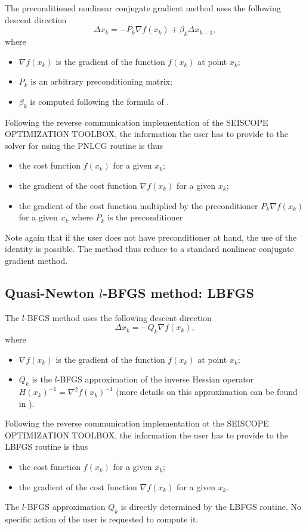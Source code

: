 \documentclass[a4paper,twoside,final,onecolumn,11pt,openright]{article}
\begin{document}
The preconditioned nonlinear conjugate gradient method uses the following descent direction
\begin{equation}
\label{nlcg}
 \Delta x_k=-P_k\nabla f(x_k)+ \beta_k \Delta x_{k-1},
\end{equation}
where 
\begin{itemize}
 \item $\nabla f(x_k)$ is the gradient of the function $f(x_k)$ at point $x_k$;
 \item $P_k$ is an arbitrary preconditioning matrix; 
 \item $\beta_k$ is computed following the formula of \citet{DAI_1999_NCG}.
\end{itemize}
Following the reverse communication implementation of the SEISCOPE OPTIMIZATION TOOLBOX, the information the user has to provide to the solver for using the PNLCG routine is thus
\begin{itemize}
 \item the cost function $f(x_k)$ for  a given $x_k$;
 \item the gradient of the cost function $\nabla f(x_k)$ for  a given $x_k$;
 \item the gradient of the cost function multiplied by the preconditioner $P_k\nabla f(x_k)$ for a given $x_k$ where $P_k$ is the preconditioner
\end{itemize}
Note again that if the user does not have preconditioner at hand, the use of the identity is possible. The method thus reduce to a standard nonlinear conjugate gradient method.

\subsection{Quasi-Newton $l$-BFGS method: LBFGS}

The $l$-BFGS method uses the following descent direction
\begin{equation}
 \Delta x_k=-Q_k\nabla f(x_k),
\end{equation}
where 
\begin{itemize}
 \item $\nabla f(x_k)$ is the gradient of the function $f(x_k)$ at point $x_k$;
 \item $Q_k$ is the $l$-BFGS approximation of the inverse Hessian operator $H(x_k)^{-1}=\nabla^2 f(x_k)^{-1}$ (more details on this approximation can be found in \citet{Byrd_1995_LMB,Nocedal_2006_NO}). 
\end{itemize}
Following the reverse communication implementation ot the SEISCOPE OPTIMIZATION TOOLBOX, the information the user has to provide to the LBFGS routine is thus 
\begin{itemize}
 \item the cost function $f(x_k)$ for  a given $x_k$;
 \item the gradient of the cost function $\nabla f(x_k)$ for a given $x_k$.
\end{itemize}
The $l$-BFGS approximation $Q_k$ is directly determined by the LBFGS routine. No specific action of the user is requested to compute it.  
\end{document}
